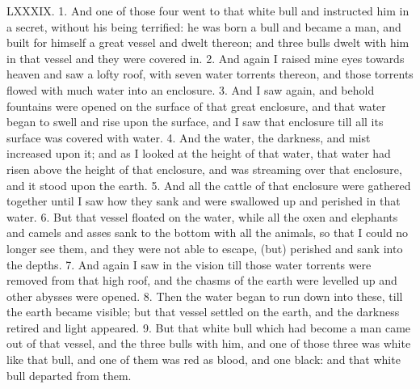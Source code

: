 LXXXIX. 1. And one of those four went to that
white bull and instructed him in a secret, without his
being terrified: he was born a bull and became a man,
and built for himself a great vessel and dwelt thereon;
and three bulls dwelt with him in that vessel and they
were covered in. 2. And again I raised mine eyes
towards heaven and saw a lofty roof, with seven water
torrents thereon, and those torrents flowed with much
water into an enclosure. 3. And I saw again, and
behold fountains were opened on the surface of that
great enclosure, and that water began to swell and
rise upon the surface, and I saw that enclosure till
all its surface was covered with water. 4. And the
water, the darkness, and mist increased upon it; and
as I looked at the height of that water, that water
had risen above the height of that enclosure, and was
streaming over that enclosure, and it stood upon the
earth. 5. And all the cattle of that enclosure were
gathered together until I saw how they sank and were
swallowed up and perished in that water. 6. But
that vessel floated on the water, while all the oxen
and elephants and camels and asses sank to the
bottom with all the animals, so that I could no longer
see them, and they were not able to escape, (but)
perished and sank into the depths. 7. And again I
saw in the vision till those water torrents were removed
from that high roof, and the chasms of the earth were
levelled up and other abysses were opened. 8. Then
the water began to run down into these, till the earth
became visible; but that vessel settled on the earth,
and the darkness retired and light appeared. 9. But
that white bull which had become a man came out of
that vessel, and the three bulls with him, and one of
those three was white like that bull, and one of them
was red as blood, and one black: and that white
bull departed from them.


